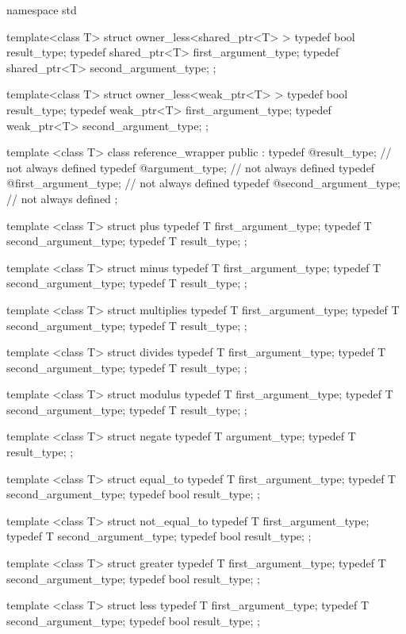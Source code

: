 \begin{codeblock}
namespace std {
  template<class T> struct owner_less<shared_ptr<T> > {
    typedef bool result_type;
    typedef shared_ptr<T> first_argument_type;
    typedef shared_ptr<T> second_argument_type;
  };

  template<class T> struct owner_less<weak_ptr<T> > {
    typedef bool result_type;
    typedef weak_ptr<T> first_argument_type;
    typedef weak_ptr<T> second_argument_type;
  };

  template <class T> class reference_wrapper {
  public :
    typedef @\seebelow@ result_type;              // not always defined
    typedef @\seebelow@ argument_type;            // not always defined
    typedef @\seebelow@ first_argument_type;      // not always defined
    typedef @\seebelow@ second_argument_type;     // not always defined
  };

  template <class T> struct plus {
    typedef T first_argument_type;
    typedef T second_argument_type;
    typedef T result_type;
  };

  template <class T> struct minus {
    typedef T first_argument_type;
    typedef T second_argument_type;
    typedef T result_type;
  };

  template <class T> struct multiplies {
    typedef T first_argument_type;
    typedef T second_argument_type;
    typedef T result_type;
  };

  template <class T> struct divides {
    typedef T first_argument_type;
    typedef T second_argument_type;
    typedef T result_type;
  };

  template <class T> struct modulus {
    typedef T first_argument_type;
    typedef T second_argument_type;
    typedef T result_type;
  };

  template <class T> struct negate {
    typedef T argument_type;
    typedef T result_type;
  };

  template <class T> struct equal_to {
    typedef T first_argument_type;
    typedef T second_argument_type;
    typedef bool result_type;
  };

  template <class T> struct not_equal_to {
    typedef T first_argument_type;
    typedef T second_argument_type;
    typedef bool result_type;
  };

  template <class T> struct greater {
    typedef T first_argument_type;
    typedef T second_argument_type;
    typedef bool result_type;
  };

  template <class T> struct less {
    typedef T first_argument_type;
    typedef T second_argument_type;
    typedef bool result_type;
  };

}
\end{codeblock}
